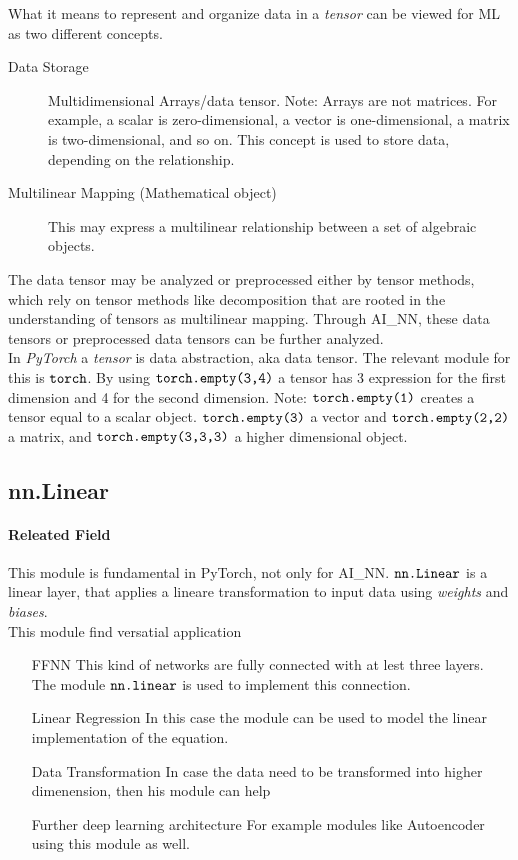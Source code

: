 What it means to represent and organize data in a \textit{tensor} can be viewed for \gls{ML} as two different concepts.
\begin{description}
    \item[Data Storage] Multidimensional Arrays/data tensor. Note: Arrays are not matrices. For example, a scalar is zero-dimensional, a vector is one-dimensional, a matrix is two-dimensional, and so on. This concept is used to store data, depending on the relationship.
    \item[Multilinear Mapping (Mathematical object)] This may express a multilinear relationship between a set of algebraic objects.
\end{description}
The data tensor may be analyzed or preprocessed either by tensor methods, which rely on tensor methods like decomposition that are rooted in the understanding of tensors as multilinear mapping. Through \gls{AI_NN}, these data tensors or preprocessed data tensors can be further analyzed.\\

In \textit{PyTorch} a \textit{tensor} is data abstraction, aka data tensor. The relevant module for this is $\verb|torch|$. By using $\verb|torch.empty(3,4)|$ a tensor has 3 expression for the first dimension and 4 for the second dimension. Note: $\verb|torch.empty(1)| $ creates a tensor equal to a scalar object. $\verb|torch.empty(3)|$  a vector and $\verb|torch.empty(2,2)|$ a matrix, and $\verb|torch.empty(3,3,3)|$ a higher dimensional object.


\subsection{nn.Linear}
\paragraph{Releated Field}
This module is fundamental in PyTorch, not only for \gls{AI_NN}. $\verb|nn.Linear|$ is a linear layer, that applies a lineare transformation to input data using \textit{weights} and \textit{biases}.\\

This module find versatial application
\begin{itemize}
	\item[\gls{FFNN}] This kind of networks are fully connected with at lest three layers. The module $\verb|nn.linear|$ is used to implement this connection.
	\item[Linear Regression] In this case the module can be used to model the linear implementation of the equation.
	\item[Data Transformation] In case the data need to be transformed into higher dimenension, then his module can help
	\item[Further deep learning architecture] For example modules like Autoencoder using this module as well. 
\end{itemize}

